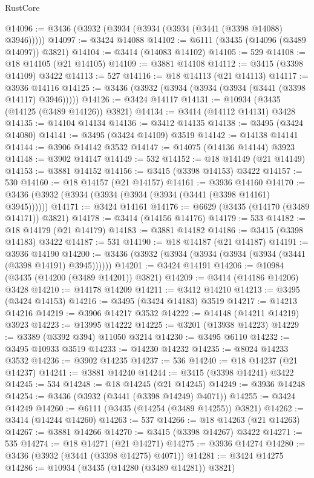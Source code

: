 \begin{lexlean}{RustCore}
\begin{coremodule}
@14096 := @3436 (@3932 (@3934 (@3934 (@3934 (@3441 (@3398 @14088) @3946)))))
@14097 := @3424 @14088
@14102 := @6111 (@3435 (@14096 (@3489 @14097)) @3821)
@14104 := @3414 (@14083 @14102)
@14105 := 529
@14108 := @18 @14105 (@21 @14105)
@14109 := @3881 @14108
@14112 := @3415 (@3398 @14109) @3422
@14113 := 527
@14116 := @18 @14113 (@21 @14113)
@14117 := @3936 @14116
@14125 := @3436 (@3932 (@3934 (@3934 (@3934 (@3441 (@3398 @14117) @3946)))))
@14126 := @3424 @14117
@14131 := @10934 (@3435 (@14125 (@3489 @14126)) @3821)
@14134 := @3414 (@14112 @14131) @3428
@14135 := @14104 @14134
@14136 := @3412 @14135
@14138 := @3495 (@3424 @14080)
@14141 := @3495 (@3424 @14109) @3519
@14142 := @14138 @14141
@14144 := @3906 @14142 @3532
@14147 := @14075 (@14136 @14144) @3923
@14148 := @3902 @14147
@14149 := 532
@14152 := @18 @14149 (@21 @14149)
@14153 := @3881 @14152
@14156 := @3415 (@3398 @14153) @3422
@14157 := 530
@14160 := @18 @14157 (@21 @14157)
@14161 := @3936 @14160
@14170 := @3436 (@3932 (@3934 (@3934 (@3934 (@3934 (@3441 (@3398 @14161) @3945))))))
@14171 := @3424 @14161
@14176 := @6629 (@3435 (@14170 (@3489 @14171)) @3821)
@14178 := @3414 (@14156 @14176)
@14179 := 533
@14182 := @18 @14179 (@21 @14179)
@14183 := @3881 @14182
@14186 := @3415 (@3398 @14183) @3422
@14187 := 531
@14190 := @18 @14187 (@21 @14187)
@14191 := @3936 @14190
@14200 := @3436 (@3932 (@3934 (@3934 (@3934 (@3934 (@3441 (@3398 @14191) @3945))))))
@14201 := @3424 @14191
@14206 := @10984 (@3435 (@14200 (@3489 @14201)) @3821)
@14209 := @3414 (@14186 @14206) @3428
@14210 := @14178 @14209
@14211 := @3412 @14210
@14213 := @3495 (@3424 @14153)
@14216 := @3495 (@3424 @14183) @3519
@14217 := @14213 @14216
@14219 := @3906 @14217 @3532
@14222 := @14148 (@14211 @14219) @3923
@14223 := @13995 @14222
@14225 := @3201 (@13938 @14223)
@14229 := @3389 (@3392 @394) @11050 @3214
@14230 := @3495 @6110
@14232 := @3495 @10933 @3519
@14233 := @14230 @14232
@14235 := @8024 @14233 @3532
@14236 := @3902 @14235
@14237 := 536
@14240 := @18 @14237 (@21 @14237)
@14241 := @3881 @14240
@14244 := @3415 (@3398 @14241) @3422
@14245 := 534
@14248 := @18 @14245 (@21 @14245)
@14249 := @3936 @14248
@14254 := @3436 (@3932 (@3441 (@3398 @14249) @4071))
@14255 := @3424 @14249
@14260 := @6111 (@3435 (@14254 (@3489 @14255)) @3821)
@14262 := @3414 (@14244 @14260)
@14263 := 537
@14266 := @18 @14263 (@21 @14263)
@14267 := @3881 @14266
@14270 := @3415 (@3398 @14267) @3422
@14271 := 535
@14274 := @18 @14271 (@21 @14271)
@14275 := @3936 @14274
@14280 := @3436 (@3932 (@3441 (@3398 @14275) @4071))
@14281 := @3424 @14275
@14286 := @10934 (@3435 (@14280 (@3489 @14281)) @3821)

\end{coremodule}
\end{lexlean}
